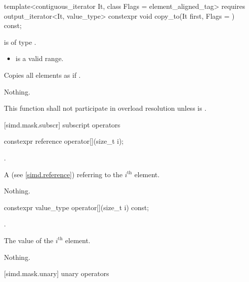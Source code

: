 \begin{itemdecl}
template<contiguous_iterator It, class Flags = element_aligned_tag>
  requires output_iterator<It, value_type>
  constexpr void copy_to(It first, Flags = {}) const;
\end{itemdecl}

\begin{itemdescr}
  \pnum\constraints
   is of type .

  \pnum\requires
  \begin{itemize}
    \item \tcode{[mem, mem + size())} is a valid range.
  \end{itemize}

  \pnum\effects
  Copies all  elements as if  \foralli.

  \pnum\throws Nothing.

  \pnum\remarks
  This function shall not participate in overload resolution unless  is .
\end{itemdescr}

[simd.mask.subscr]{\texorpdfstring{ subscript}{simd_mask subscript} operators}

\begin{itemdecl}
constexpr reference operator[](size_t i);
\end{itemdecl}

\begin{itemdescr}
  \pnum\requires
  .

  \pnum\returns
  A  (see \ref{simd.reference}) referring to the $i^\text{th}$ element.

  \pnum\throws Nothing.
\end{itemdescr}

\begin{itemdecl}
constexpr value_type operator[](size_t i) const;
\end{itemdecl}

\begin{itemdescr}
  \pnum\requires
  .

  \pnum\returns
  The value of the $i^\text{th}$ element.

  \pnum\throws Nothing.
\end{itemdescr}

[simd.mask.unary]{\texorpdfstring{ unary}{simd_mask unary} operators}

